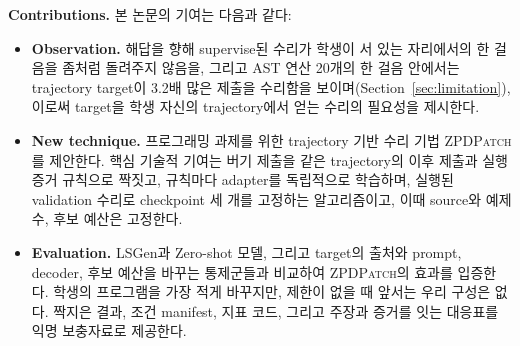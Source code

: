 \documentclass[10pt,conference]{IEEEtran}
\begin{document}
\noindent\textbf{Contributions.} 본 논문의 기여는 다음과 같다:
\begin{itemize}
\item \textbf{Observation.} 해답을 향해 supervise된 수리가 학생이 서 있는 자리에서의 한 걸음을 좀처럼 돌려주지 않음을, 그리고 AST 연산 20개의 한 걸음 안에서는 trajectory target이 3.2배 많은 제출을 수리함을 보이며(Section~\ref{sec:limitation}), 이로써 target을 학생 자신의 trajectory에서 얻는 수리의 필요성을 제시한다.
\item \textbf{New technique.} 프로그래밍 과제를 위한 trajectory 기반 수리 기법 \textsc{ZPDPatch}를 제안한다. 핵심 기술적 기여는 버기 제출을 같은 trajectory의 이후 제출과 실행 증거 규칙으로 짝짓고, 규칙마다 adapter를 독립적으로 학습하며, 실행된 validation 수리로 checkpoint 세 개를 고정하는 알고리즘이고, 이때 source와 예제 수, 후보 예산은 고정한다.
\item \textbf{Evaluation.} LSGen과 Zero-shot 모델, 그리고 target의 출처와 prompt, decoder, 후보 예산을 바꾸는 통제군들과 비교하여 \textsc{ZPDPatch}의 효과를 입증한다. 학생의 프로그램을 가장 적게 바꾸지만, 제한이 없을 때 앞서는 우리 구성은 없다. 짝지은 결과, 조건 manifest, 지표 코드, 그리고 주장과 증거를 잇는 대응표를 익명 보충자료로 제공한다.
\end{itemize}
\end{document}
